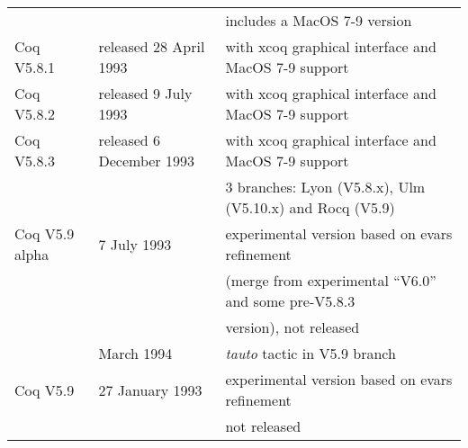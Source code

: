 \documentclass[a4paper]{book}
\newcommand{\feature}[1]{{\em #1}}
\begin{document}
\begin{tabular}{l|l|l}
& & includes a MacOS 7-9 version\\

Coq V5.8.1& released 28 April 1993 & with xcoq graphical interface and MacOS 7-9 support\\

Coq V5.8.2& released 9 July 1993 & with xcoq graphical interface and MacOS 7-9 support\\

Coq V5.8.3& released 6 December 1993 %
          & with xcoq graphical interface and MacOS 7-9 support\\

 & & 3 branches: Lyon (V5.8.x), Ulm (V5.10.x) and Rocq (V5.9)\\

Coq V5.9 alpha& 7 July 1993 & 
experimental version based on evars refinement \\
              & & (merge from experimental ``V6.0'' and some pre-V5.8.3 \\
              & & version), not released\\

& March 1994 & \feature{tauto} tactic in V5.9 branch\\

Coq V5.9 & 27 January 1993 & experimental version based on evars refinement\\
         & & not released\\
\end{tabular}

\bigskip
\bigskip


\newpage
\end{document}
